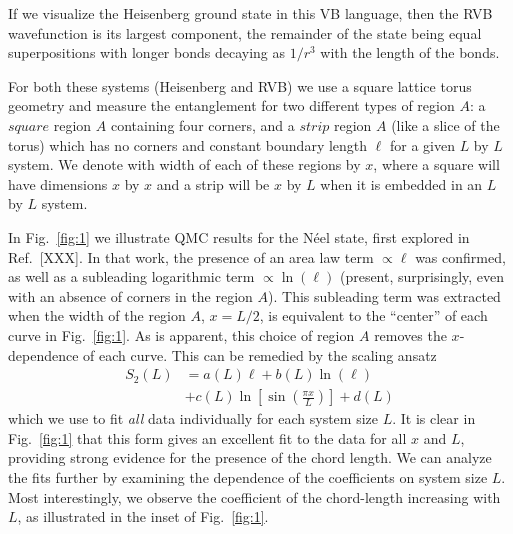 \documentclass[prl,aps,twocolumn,floatfix,amsmath,amssymb,superscriptaddress,tightenlines]{revtex4}
\begin{document}
If we visualize the Heisenberg ground state in this VB language, then the RVB wavefunction is its largest component, the remainder of the state being equal superpositions with longer bonds decaying as $1/r^3$ \cite{Sandvik_VB_decay} with the length of the bonds.

For both these systems (Heisenberg and RVB) we use a square lattice torus geometry and measure the entanglement for two different types of region $A$:
a $square$ region $A$ containing four corners, and a $strip$ region $A$ (like a slice of the torus) which has no corners and constant boundary length $\ell$ for a given $L$ by $L$ system.
We denote with width of each of these regions by $x$, where a square will have dimensions $x$ by $x$ and a strip will be $x$ by $L$ when it is embedded in an $L$ by $L$ system.

In Fig.~{\ref{fig:1}} we illustrate QMC results for the N\'eel state, first explored in Ref.~[XXX].  In that work, the presence of an area law term $\propto \ell$ was confirmed, as well as a subleading logarithmic term $\propto \ln(\ell)$ (present, surprisingly, even with an absence of corners in the region $A$).  This subleading term was extracted when the width of the region $A$, $x = L/2$, is equivalent to the ``center'' of each curve in Fig.~{\ref{fig:1}}.  As is apparent, this choice of region $A$ removes the $x$-dependence of each curve.  This can be remedied
by the scaling ansatz
\begin{align}
S_2(L) &= a(L) \ell + b(L) \ln(\ell) \nonumber \\
&+ c(L) \ln \left[{ \sin\left({ \frac{\pi x}{L} }\right) }\right] + d(L) \label{Fit}
\end{align}
{\color{red} which we use to fit {\it all} data individually for each system size $L$. }
It is clear in Fig.~{\ref{fig:1}} that this form gives an excellent fit to the data for all $x$ and $L$, providing strong evidence for the presence of the chord length.  We can analyze the fits further by examining the dependence of the coefficients on system size $L$.  Most interestingly, we observe the coefficient of the chord-length increasing with $L$, as illustrated in the inset of Fig.~{\ref{fig:1}}.
\end{document}
